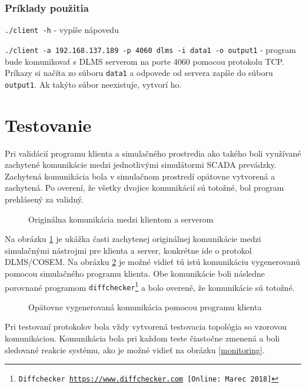 \subsubsection{Príklady použitia}
\begin{description}
\item {\tt ./client -h} - vypíše nápovedu
\item {\tt ./client -a 192.168.137.189 -p 4060 \textendash\textendash dlms -i data1 -o output1} - program bude komunikovať s DLMS serverom na porte 4060 pomocou protokolu TCP. Príkazy si načíta zo súboru {\tt data1} a odpovede od servera zapíše do súboru {\tt output1}. Ak takýto súbor neexistuje, vytvorí ho.
\end{description}
\section{Testovanie}
\tab Pri validácií programu klienta a simulačného prostredia ako takého boli využívané zachytené komunikácie medzi jednotlivými simulátormi SCADA prevádzky. Zachytená komunikácia bola v simulačnom prostredí opätovne vytvorená a zachytená. Po overení, že všetky dvojice komunikácií sú totožné, bol program prehlásený za validný. \par
\begin{figure}[h]
    \centering
    \caption{Originálna komunikácia medzi klientom a serverom}
    \label{original}
\end{figure}
Na obrázku \ref{original} je ukážka časti zachytenej originálnej komunikácie medzi simulačnými nástrojmi pre klienta a server, konkrétne ide o protokol DLMS/COSEM. Na obrázku \ref{testing} je možné vidieť tú istú komunikáciu vygenerovanú pomocou simulačného programu klienta. Obe komunikácie boli následne porovnané programom {\tt diffchecker\footnote{Diffchecker \url{https://www.diffchecker.com} [Online: Marec 2018]}} a bolo overené, že komunikácie sú totožné. \par
\begin{figure}[h]
    \centering
    \caption{Opätovne vygenerovaná komunikácia pomocou programu klienta}
    \label{testing}
\end{figure}
Pri testovaní protokolov bola vždy vytvorená testovacia topológia so vzorovou komunikáciou. Komunikácia bola pri každom teste čiastočne zmenená a boli sledované reakcie systému, ako je možné vidieť na obrázku \ref{monitoring}. \par
